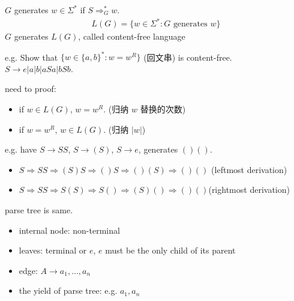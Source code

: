 \begin{definition}
    $G$ generates $w\in \Sigma^*$ if $S\Rightarrow_G^* w$. 
    \begin{align*}
        L(G)=\{ w\in \Sigma^*: G\text{ generates }w \}
    \end{align*}
    $G$ generates $L(G)$, called content-free language
\end{definition}

e.g. Show that $\{ w\in \{ a,b \}^*: w=w^R \}$ (回文串) is content-free.\\
$S\to e|a|b|aSa|bSb$. 

need to proof:
\begin{itemize}
    \item if $w\in L(G)$, $w=w^R$. (归纳 $w$ 替换的次数)
    \item if $w=w^R$, $w\in L(G)$. (归纳 $|w|$)
\end{itemize}

e.g. have $S\to SS$, $S\to (S)$, $S\to e$, generates $()()$. 
\begin{itemize}
    \item $S\Rightarrow SS\Rightarrow (S)S\Rightarrow ()S\Rightarrow()(S)\Rightarrow()()$ (leftmost derivation)
    \item $S\Rightarrow SS\Rightarrow S(S)\Rightarrow S()\Rightarrow (S)()\Rightarrow ()()$(rightmost derivation)
\end{itemize}
parse tree is same. 

\begin{definition}
    \quad

    \begin{itemize}
        \item internal node: non-terminal
        \item leaves: terminal or $e$, $e$ must be the only child of its parent
        \item edge: $A\to a_1,\dots,a_n$
        
        \begin{figure}[H]
            \centering
        \end{figure}

        \item the yield of parse tree: e.g. $a_1,a_n$
    \end{itemize}
\end{definition}

